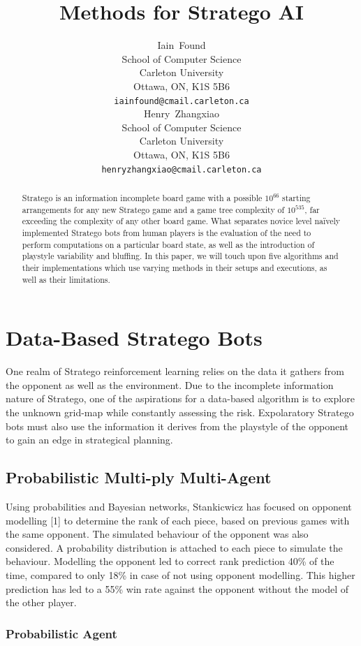 \documentclass{article}
\title{Methods for Stratego AI}
\author{%
  Iain~Found\\
  School of Computer Science\\
  Carleton University\\
  Ottawa, ON, K1S 5B6 \\
  \texttt{iainfound@cmail.carleton.ca} \\
  \And
  Henry~Zhangxiao\\
  School of Computer Science\\
  Carleton University\\
  Ottawa, ON, K1S 5B6 \\
  \texttt{henryzhangxiao@cmail.carleton.ca} \\
}
\begin{document}
\maketitle

\begin{abstract}
Stratego is an information incomplete board game with a possible $10^{66}$ starting arrangements for any new Stratego game and a game tree complexity of $10^{535}$, far exceeding the complexity of any other board game.
What separates novice level naïvely implemented Stratego bots from human players is the evaluation of the need to perform computations on a particular board state, as well as the introduction of playstyle variability and bluffing.
In this paper, we will touch upon five algorithms and their implementations which use varying methods in their setups and executions, as well as their limitations.
\end{abstract}

\section{Data-Based Stratego Bots }

One realm of Stratego reinforcement learning relies on the data it gathers from the opponent as well as the environment.
Due to the incomplete information nature of Stratego, one of the aspirations for a data-based algorithm is to explore the unknown grid-map while constantly assessing the risk.
Expolaratory Stratego bots must also use the information it derives from the playstyle of the opponent to gain an edge in strategical planning.

\subsection{Probabilistic Multi-ply Multi-Agent}

Using probabilities and Bayesian networks, Stankicwicz has focused on opponent modelling [1] to determine the rank of each piece, based on previous games with the same opponent. 
The simulated behaviour of the opponent was also considered. A probability distribution is attached to each piece to simulate the behaviour. 
Modelling the opponent led to correct rank prediction 40\% of the time, compared to only 18\% in case of not using opponent modelling. 
This higher prediction has led to a 55\% win rate against the opponent without the model of the other player.

\subsubsection{Probabilistic Agent}
\end{document}
